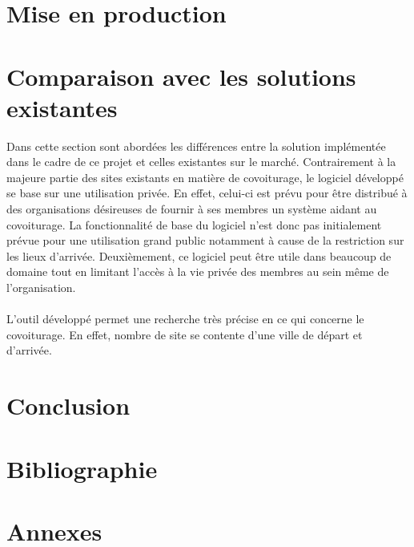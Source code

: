 \documentclass[12pt, a4paper, oneside]{article}
\begin{document}
\section{Mise en production}
\section{Comparaison avec les solutions existantes}
    Dans cette section sont abordées les différences entre la solution implémentée dans le cadre de ce projet et celles existantes sur le marché. Contrairement à la majeure partie des sites existants en matière de covoiturage, le logiciel développé se base sur une utilisation privée. En effet, celui-ci est prévu pour être distribué à des organisations désireuses de fournir à ses membres un système aidant au covoiturage. La fonctionnalité de base du logiciel n'est donc pas initialement prévue pour une utilisation grand public notamment à cause de la restriction sur les lieux d'arrivée. Deuxièmement, ce logiciel peut être utile dans beaucoup de domaine tout en limitant l'accès à la vie privée des membres au sein même de l'organisation.\\\\
    \indent L'outil développé permet une recherche très précise en ce qui concerne le covoiturage. En effet, nombre de site se contente d'une ville de départ et d'arrivée. 
\section{Conclusion}
\section{Bibliographie}
%
%
\section{Annexes}
\end{document}
